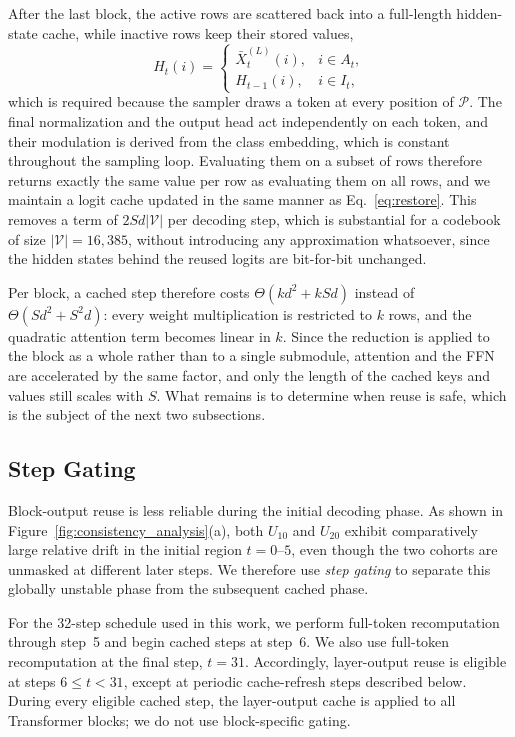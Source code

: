 After the last block, the active rows are scattered back into a full-length hidden-state cache, while inactive rows keep their stored values,
\begin{equation}
    H_t(i) =
    \begin{cases}
        \bar{X}^{(L)}_t(i), & i\in A_t,\\[2pt]
        H_{t-1}(i),         & i\in I_t,
    \end{cases}
    \label{eq:restore}
\end{equation}
which is required because the sampler draws a token at every position of $\mathcal{P}$. The final normalization and the output head act independently on each token, and their modulation is derived from the class embedding, which is constant throughout the sampling loop. Evaluating them on a subset of rows therefore returns exactly the same value per row as evaluating them on all rows, and we maintain a logit cache updated in the same manner as Eq.~\eqref{eq:restore}. This removes a term of $2Sd|\mathcal{V}|$ per decoding step, which is substantial for a codebook of size $|\mathcal{V}|=16{,}385$, without introducing any approximation whatsoever, since the hidden states behind the reused logits are bit-for-bit unchanged.

Per block, a cached step therefore costs $\Theta(kd^2+kSd)$ instead of $\Theta(Sd^2+S^2d)$: every weight multiplication is restricted to $k$ rows, and the quadratic attention term becomes linear in $k$. Since the reduction is applied to the block as a whole rather than to a single submodule, attention and the FFN are accelerated by the same factor, and only the length of the cached keys and values still scales with $S$. What remains is to determine when reuse is safe, which is the subject of the next two subsections.

\subsection{Step Gating}
\label{sec:gate}

Block-output reuse is less reliable during the initial decoding phase. As shown in Figure~\ref{fig:consistency_analysis}(a), both $U_{10}$ and $U_{20}$ exhibit comparatively large relative drift in the initial region $t=0$--$5$, even though the two cohorts are unmasked at different later steps. We therefore use \emph{step gating} to separate this globally unstable phase from the subsequent cached phase.

For the 32-step schedule used in this work, we perform full-token recomputation through step~5 and begin cached steps at step~6. We also use full-token recomputation at the final step, $t=31$. Accordingly, layer-output reuse is eligible at steps $6\leq t<31$, except at periodic cache-refresh steps described below. During every eligible cached step, the layer-output cache is applied to all Transformer blocks; we do not use block-specific gating.

